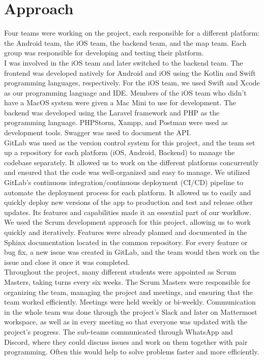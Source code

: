 \documentclass[sf-font,usefira,english]{uulm/sp/article}
\begin{document}
\section{Approach}

Four teams were working on the project, each responsible for a different platform:
the Android team, the iOS team, the backend team, and the map team.
Each group was responsible for developing and testing their platform.\\

I was involved in the iOS team and later switched to the backend team.
The frontend was developed natively for Android and iOS using the Kotlin and Swift programming languages, respectively.
For the iOS team, we used Swift and Xcode as our programming language and IDE.
Members of the iOS team who didn’t have a MacOS system were given a Mac Mini to use for development.
The backend was developed using the Laravel framework and PHP as the programming language.
PHPStorm, Xampp, and Postman were used as development tools. Swagger was used to document the API.\\

GitLab was used as the version control system for this project, and the team set up a repository for each platform (iOS, Android, Backend) to manage the codebase separately.
It allowed us to work on the different platforms concurrently and ensured that the code was well-organized and easy to manage.
We utilized GitLab’s continuous integration/continuous deployment (CI/CD) pipeline to automate the deployment process for each platform.
It allowed us to easily and quickly deploy new versions of the app to production and test and release other updates.
Its features and capabilities made it an essential part of our workflow.\\

We used the Scrum development approach for this project, allowing us to work quickly and iteratively.
Features were already planned and documented in the Sphinx documentation located in the common repository.
For every feature or bug fix, a new issue was created in GitLab, and the team would then work on the issue and close it once it was completed.\\

Throughout the project, many different students were appointed as Scrum Masters, taking turns every six weeks.
The Scrum Masters were responsible for organizing the team, managing the project and meetings, and ensuring that the team worked efficiently.
Meetings were held weekly or bi-weekly.
Communication in the whole team was done through the project's Slack and later on Mattermost workspace, as well as in every meeting so that everyone was updated with the project's progress.
The sub-teams communicated through WhatsApp and Discord, where they could discuss issues and work on them together with pair programming.
Often this would help to solve problems faster and more efficiently.
\end{document}
